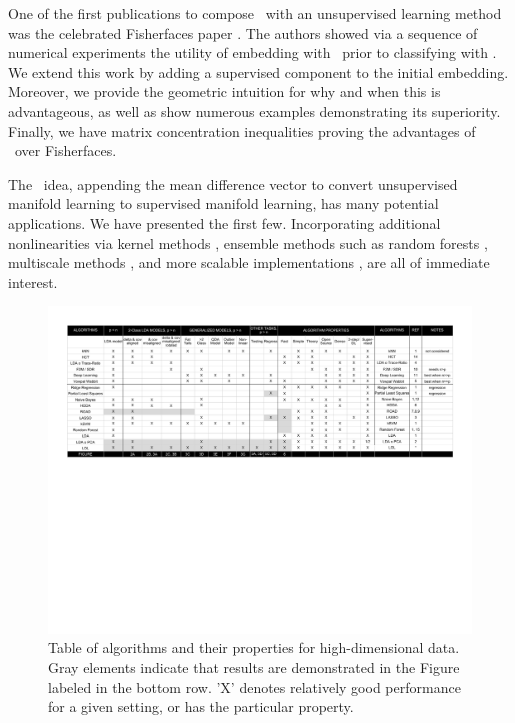 \documentclass[10pt]{article}
\begin{document}
One of the first publications to compose \Fld~with an unsupervised learning method was the celebrated Fisherfaces paper \cite{Belhumeur1997a}.  The authors showed via a sequence of numerical experiments the utility of embedding with \Pca~prior to classifying with \Fld.  We extend this work by adding a supervised component to the initial embedding.  Moreover, we provide the geometric intuition for why and when this is advantageous, as well as show numerous examples demonstrating its superiority.  Finally, we have matrix concentration inequalities proving the advantages of \Lol~over Fisherfaces.  


The \Lol~idea, appending the mean difference vector to convert unsupervised manifold learning to supervised manifold learning, has many potential applications.  We have presented the first few.  Incorporating additional nonlinearities via kernel methods \cite{Mika1999a}, ensemble methods such as random forests \cite{Breiman2001a}, multiscale methods \cite{Allard2012},  and more scalable implementations \cite{Chang2011a}, are all of immediate interest.


\clearpage

\begin{figure}
\centering
\includegraphics[width=1\linewidth,trim=0.5in 4.5in 0.5in 0.5in,clip=true]{../Figs/table} %
\caption{Table of algorithms and their properties for high-dimensional data. Gray elements indicate that results are demonstrated in the Figure labeled in the bottom row. 'X' denotes relatively good performance for a given setting, or has the particular property.
}
\label{fig:table}
\end{figure}
\end{document}
